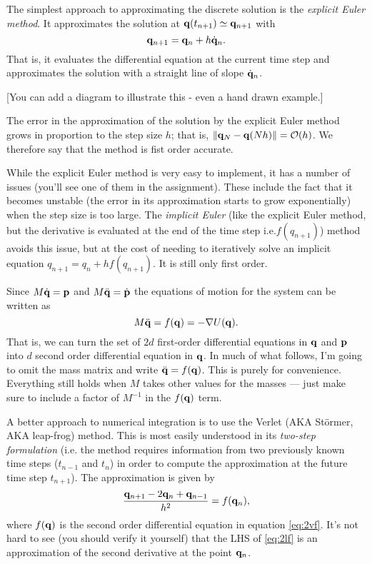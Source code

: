 The simplest approach to approximating the discrete solution is the \emph{explicit Euler method}. It approximates the solution at ${\bf q}(t_{n+1})\simeq {\bf q}_{n+1}$ with
$$
	{\bf q}_{n+1} = {\bf q}_n + h \dot{\bf q}_n.
$$
That is, it evaluates the differential equation at the current time step and approximates the solution with a straight line of slope $\dot{\bf q}_n$. 

[You can add a diagram to illustrate this - even a hand drawn example.]

The error in the approximation of the solution by the explicit Euler method grows in proportion to the step size $h$; that is, $\|{\bf q}_N-{\bf q}(Nh)\|=\mathcal{O}(h)$. We therefore say that the method is fist order accurate.

While the explicit Euler method is very easy to implement, it has a number of issues (you'll see one of them in the assignment). These include the fact that it becomes unstable (the error in its approximation starts to grow exponentially) when the step size is too large. The \emph{implicit Euler} (like the explicit Euler method, but the derivative is evaluated at the end of the time step i.e.$f(q_{n+1})$) method avoids this issue, but at the cost of needing to iteratively solve an implicit equation $q_{n+1}=q_n+hf(q_{n+1})$. It is still only first order.

Since $M\dot{\bf q} = {\bf p}$ and $M\ddot{\bf q} = \dot{\bf p}$ the equations of motion for the system can be written as
\begin{equation}
	M\ddot{\bf q} = f({\bf q}) = -\nabla U({\bf q}).
	\label{eq:2vf}
\end{equation}
That is, we can turn the set of $2d$ first-order differential equations in ${\bf q}$ and ${\bf p}$ into $d$ second order differential equation in ${\bf q}$.
In much of what follows, I'm going to omit the mass matrix and write $\ddot{\bf q} = f({\bf q})$. This is purely for convenience. Everything still holds when $M$ takes other values for the masses --- just make sure to include a factor of $M^{-1}$ in the $f({\bf q})$ term.

A better approach to numerical integration is to use the Verlet (AKA St\"{o}rmer, AKA leap-frog) method. This is most easily understood in its \emph{two-step formulation} (i.e. the method requires information from two previously known time steps ($t_{n-1}$ and $t_n$) in order to compute the approximation at the future time step $t_{n+1}$). The approximation is given by 
\begin{equation}
	\frac{{\bf q}_{n+1} - 2{\bf q}_n + {\bf q}_{n-1}}{h^2} = f({\bf q}_n),
	\label{eq:2lf}
\end{equation}
where $f({\bf q})$ is the second order differential equation in equation \ref{eq:2vf}. It's not hard to see (you should verify it yourself) that the LHS of \ref{eq:2lf} is an approximation of the second derivative at the point ${\bf q}_n$.

